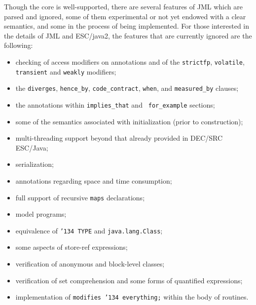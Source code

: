 \documentclass{sig-alternate}
\begin{document}
Though the core is well-supported, there are several features of JML
which are parsed and ignored, some of them experimental or not yet
endowed with a clear semantics, and some in the process of being implemented.
For those interested in the details of JML and ESC/java2,
 the features that are currently ignored are the following:
\setlength{\partopsep}{0in}\setlength{\parskip}{0in}\setlength{\itemsep}{0in}\setlength{\topsep}{0in}
\begin{itemize}
\setlength{\partopsep}{0in}\setlength{\parskip}{0in}\setlength{\itemsep}{0in}\setlength{\topsep}{0in}
\item checking of access modifiers on annotations and of the
 \texttt{strictfp}, \texttt{volatile},
  \texttt{transient} and \texttt{weakly} modifiers;
\item the \texttt{diverges}, \texttt{hence\_by},
  \texttt{code\_contract}, \texttt{when}, and \texttt{measured\_by}
  clauses;
\item the annotations within \texttt{implies\_that} and {\tt
    for\_example} sections;
\item some of the semantics associated with initialization (prior to
  construction);
\item multi-threading support beyond that already provided in DEC/SRC ESC/\-Java;
\item serialization;
\item annotations regarding space and time consumption;
\item full support of recursive \texttt{maps} declarations;
\item model programs;
\item equivalence of \texttt{\char'134 TYPE} and \texttt{java.lang.Class};
\item some aspects of store-ref expressions;
\item verification of anonymous and block-level classes;
\item verification of set comprehension and some forms of quantified
  expressions;
\item implementation of \texttt{modifies \char'134 everything;} within
  the body of routines.
\end{itemize}


\end{document}
